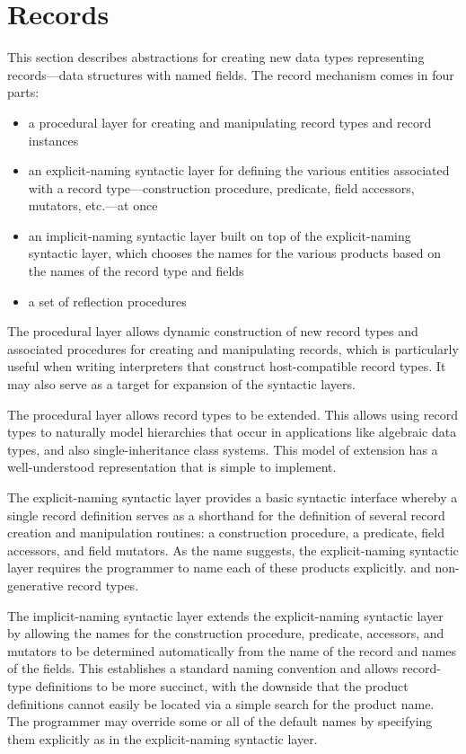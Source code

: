 \chapter{Records}
\label{recordschapter}

This section describes abstractions for creating new data types
representing records---data structures with named fields. The record
mechanism comes in four parts:

\begin{itemize}
\item a procedural layer for creating and manipulating record types and record
  instances
\item an explicit-naming syntactic layer for defining the various entities
  associated with a record type---construction procedure, predicate, field
  accessors, mutators, etc.---at once
\item an implicit-naming syntactic layer built on top of the explicit-naming
  syntactic layer, which chooses the names for the various products based on
  the names of the record type and fields
\item a set of reflection procedures
\end{itemize}
% 
The procedural layer allows dynamic construction of new record types and
associated procedures for creating and manipulating records, which is
particularly useful when writing interpreters that construct host-compatible
record types. It may also serve as a target for expansion of the syntactic
layers.

The procedural layer allows record types to be extended. This allows using
record types to naturally model hierarchies that occur in applications like
algebraic data types, and also single-inheritance class systems. This model of
extension has a well-understood representation that is simple to implement.

The explicit-naming syntactic layer provides a basic syntactic interface
whereby a single record definition serves as a shorthand for the definition of
several record creation and manipulation routines: a construction procedure, a
predicate, field accessors, and field mutators. As the name suggests, the
explicit-naming syntactic layer requires the programmer to name each of these
products explicitly.
and non-generative record types.

The implicit-naming syntactic layer extends the explicit-naming syntactic layer
by allowing the names for the construction procedure, predicate, accessors, and
mutators to be determined automatically from the name of the record and names
of the fields. This establishes a standard naming convention and allows
record-type definitions to be more succinct, with the downside that the product
definitions cannot easily be located via a simple search for the product name.
The programmer may override some or all of the default names by specifying them
explicitly as in the explicit-naming syntactic layer.

